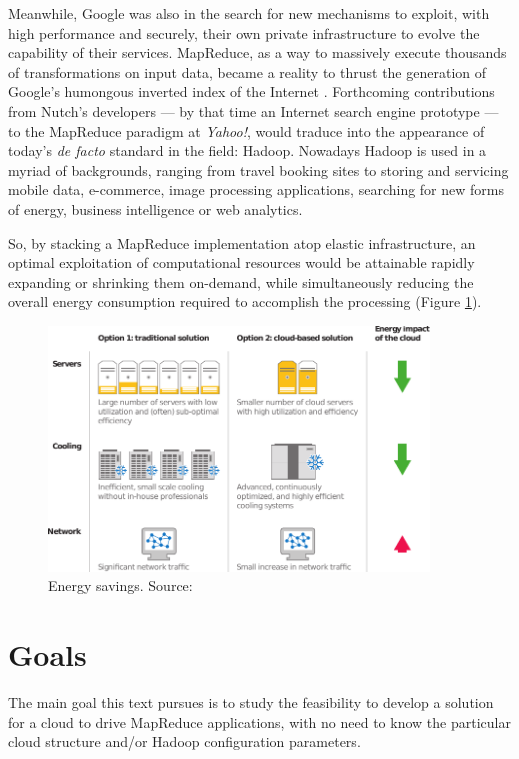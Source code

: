 Meanwhile, Google was also in the search for new mechanisms to exploit, with high performance and securely, their own private infrastructure to evolve the capability of their services. MapReduce, as a way to massively execute thousands of transformations on input data, became a reality to thrust the generation of Google's humongous inverted index of the Internet \cite{googlemapreduce}. Forthcoming contributions from Nutch's developers --- by that time an Internet search engine prototype --- to the MapReduce paradigm at \emph{Yahoo!}, would traduce into the appearance of today's \emph{de facto} standard in the field: Hadoop. Nowadays Hadoop is used in a myriad of backgrounds, ranging from travel booking sites to storing and servicing mobile data, e-commerce, image processing applications, searching for new forms of energy, business intelligence or web analytics.

So, by stacking a MapReduce implementation atop elastic infrastructure, an optimal exploitation of computational resources would be attainable rapidly expanding or shrinking them on-demand, while simultaneously reducing the overall energy consumption required to accomplish the processing (Figure \ref{fig:energysavings}).

\begin{figure}[tbp]
\begin{center}
\includegraphics[width=0.9\textwidth]{imagenes/002.pdf}
 \caption{Energy savings. Source: \cite{googleapps}}
\label{fig:energysavings}
\end{center}
\end{figure}

\section{Goals}\label{sec:objetivos}
\noindent The main goal this text pursues is to study the feasibility to develop a solution for a cloud to drive MapReduce applications, with no need to know the particular cloud structure and/or Hadoop configuration parameters.

